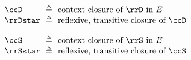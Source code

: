 \begin{flushleft}
\medskip
\begin{minipage}[t]{0.5\columnwidth}
\begin{mathpar}

\end{mathpar}
\end{minipage}%
\begin{minipage}[t]{0.5\columnwidth}
\begin{mathpar}
\end{mathpar}
\end{minipage}

\medskip
$\begin{array}{l@{~~}c@{~~}l}
  \ccD & \triangleq & \mbox{context closure of $\rrD$ in $E$}
\\
  \rrDstar & \triangleq & \mbox{reflexive, transitive closure of $\ccD$}
\end{array}$

\medskip
$\begin{array}{l@{~~}c@{~~}l}
  \ccS & \triangleq & \mbox{context closure of $\rrS$ in $E$}
\\
  \rrSstar & \triangleq & \mbox{reflexive, transitive closure of $\ccS$}
\end{array}$
\end{flushleft}
